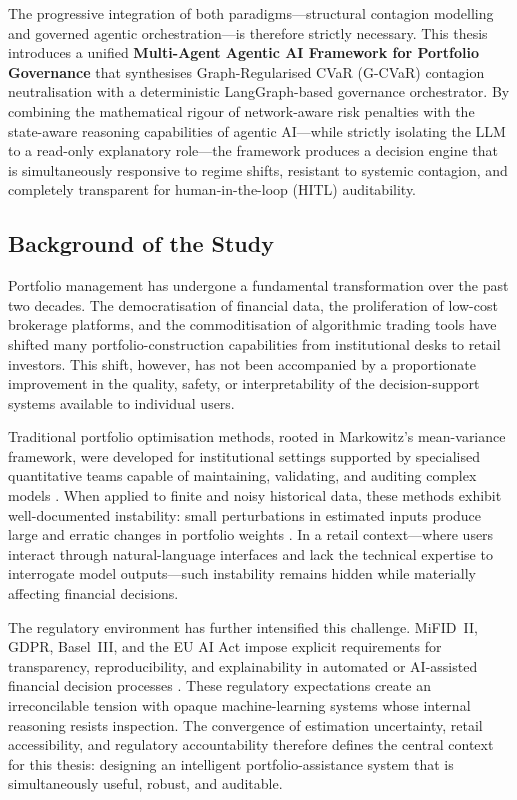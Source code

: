 \documentclass[11pt]{article}
\begin{document}
The progressive integration of both paradigms---structural contagion modelling and governed agentic orchestration---is therefore strictly necessary. This thesis introduces a unified \textbf{Multi-Agent Agentic AI Framework for Portfolio Governance} that synthesises Graph-Regularised CVaR (G-CVaR) contagion neutralisation with a deterministic LangGraph-based governance orchestrator. By combining the mathematical rigour of network-aware risk penalties with the state-aware reasoning capabilities of agentic AI---while strictly isolating the LLM to a read-only explanatory role---the framework produces a decision engine that is simultaneously responsive to regime shifts, resistant to systemic contagion, and completely transparent for human-in-the-loop (HITL) auditability.

\subsection{Background of the Study}
Portfolio management has undergone a fundamental transformation over the past two decades. The democratisation of financial data, the proliferation of low-cost brokerage platforms, and the commoditisation of algorithmic trading tools have shifted many portfolio-construction capabilities from institutional desks to retail investors. This shift, however, has not been accompanied by a proportionate improvement in the quality, safety, or interpretability of the decision-support systems available to individual users.

Traditional portfolio optimisation methods, rooted in Markowitz's mean-variance framework, were developed for institutional settings supported by specialised quantitative teams capable of maintaining, validating, and auditing complex models \cite{markowitz1952}. When applied to finite and noisy historical data, these methods exhibit well-documented instability: small perturbations in estimated inputs produce large and erratic changes in portfolio weights \cite{best1991,chopra1993}. In a retail context---where users interact through natural-language interfaces and lack the technical expertise to interrogate model outputs---such instability remains hidden while materially affecting financial decisions.

The regulatory environment has further intensified this challenge. MiFID~II, GDPR, Basel~III, and the EU AI Act impose explicit requirements for transparency, reproducibility, and explainability in automated or AI-assisted financial decision processes \cite{mifid2014,gdpr2016,basel2011,aiact2024}. These regulatory expectations create an irreconcilable tension with opaque machine-learning systems whose internal reasoning resists inspection. The convergence of estimation uncertainty, retail accessibility, and regulatory accountability therefore defines the central context for this thesis: designing an intelligent portfolio-assistance system that is simultaneously useful, robust, and auditable.
\end{document}

